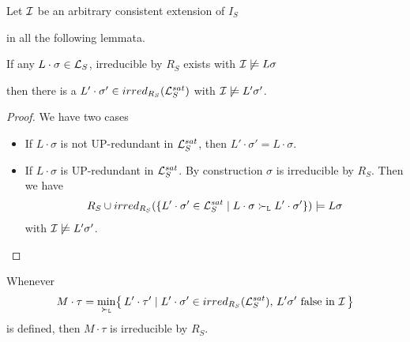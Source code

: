             Let \( \mathcal{I} \) be an arbitrary consistent extension of \( I_S \)

            in all the following lemmata.


       \begin{lemma}\label{existence}

        If any \( L\cdot\sigma\in\mathcal{L}_S \), irreducible by \( R_S \) exists with \( \mathcal{I}\not\models L\sigma \)

        then there is a \( L'\cdot\sigma'\in irred_{R_S}(\mathcal{L}_S^{sat}) \) with \( \mathcal{I}\not\models L'\sigma' \).
       \end{lemma}

       \begin{proof}
            We have two cases

       \begin{itemize}
           \item If \( L\cdot\sigma \) is not UP-redundant in \( \mathcal{L}_S^{sat} \),
            then \( L'\cdot\sigma'=L\cdot\sigma \).
           \hfill\checkmark{}

           \item If \( L\cdot\sigma \) is UP-redundant in \( \mathcal{L}_S^{sat} \).
        By construction \( \sigma \) is irreducible by \( R_S \). Then we have
       \begin{align*}
            R_S \cup irred_{R_S}(
               \{
                L'\cdot\sigma'\in\mathcal{L}_S^{sat}
               \mid
                L\cdot\sigma \mathrel\succ_{\mathtt{L}} L'\cdot\sigma'
               \}
            )
           \models
            L\sigma
       \end{align*}
        with \( \mathcal{I}\not\models L'\sigma' \).
       \hfill \checkmark{}
       \end{itemize}
   \end{proof}


       \begin{lemma}\label{irreducible}
            Whenever
           \begin{gather*}
                M\cdot\tau = \min_{\mathrel\succ_{\mathtt{L}}}\!
               \left \{ \,
                L'\cdot\tau' \mid
                L'\cdot\sigma' \in irred_{R_S}(\mathcal{L}_S^{sat}), \,
                L'\sigma'\text{ false in }\mathcal{I} \,
               \right \}
           \end{gather*}
            is defined, then \( M\cdot\tau \) is irreducible by \( R_S \).
       \end{lemma}

